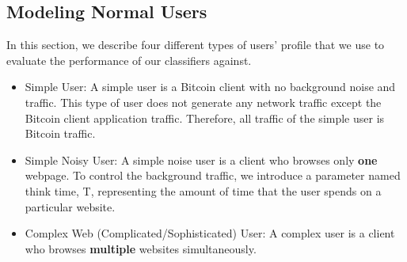\subsection{Modeling Normal Users}\label{simpleuser}

In this section, we describe four different types of users' profile that we use to evaluate the performance of our \bc classifiers against.%

\begin{itemize}
    \item Simple User: A simple user is a Bitcoin client with no background noise and traffic. This type of user does not generate any network traffic except the Bitcoin client application traffic. Therefore, all traffic of the simple user is Bitcoin traffic. 
    \item Simple Noisy User: A simple noise user is a \bc client who browses only \textbf{one} webpage.%
    To control the background traffic, we introduce a parameter named think time, T, representing the amount of time that the user spends on a particular website. %
    \item Complex Web (Complicated/Sophisticated) User: A complex user is a \bc client who browses \textbf{multiple} websites simultaneously.
    

\end{itemize}
